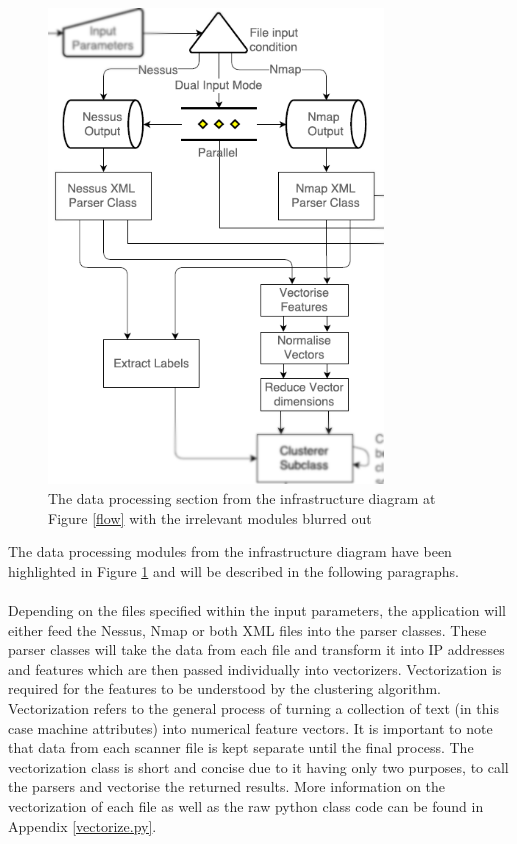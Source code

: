 \begin{figure}[!h]
\centering
\includegraphics[width=3.5in]{./Figures/infra2.png}
\caption{The data processing section from the infrastructure diagram at Figure \ref{flow} with the irrelevant modules blurred out}
\label{infra2}
\end{figure}
The data processing modules from the infrastructure diagram have been highlighted in Figure \ref{infra2} and will be described in the following paragraphs. \paragraph{}Depending on the files specified within  the input parameters, the application will either feed the Nessus, Nmap or both XML files into the parser classes. These parser classes will take the data from each file and transform it into IP addresses and features which are then passed individually into vectorizers. Vectorization is required for the features to be understood by the clustering algorithm. Vectorization refers to the general process of turning a collection of text (in this case machine attributes) into numerical feature vectors. It is important to note that data from each scanner file is kept separate until the final process. The vectorization class is short and concise due to it having only two purposes, to call the parsers and vectorise the returned results. More information on the vectorization of each file as well as the raw python class code can be found in Appendix \ref{vectorize.py}.

